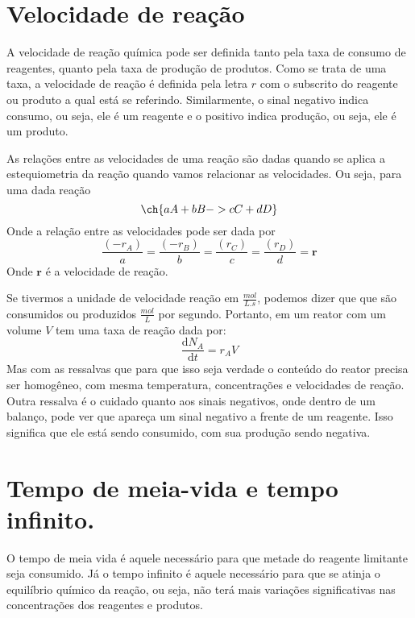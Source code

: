 \section{Velocidade de reação}
A velocidade de reação química pode ser definida tanto pela taxa de consumo de reagentes, quanto
pela taxa de produção de produtos. Como se trata de uma taxa, a velocidade de reação é definida pela
letra \(r\) com o subscrito do reagente ou produto a qual está se referindo. Similarmente, o sinal
negativo indica consumo, ou seja, ele é um reagente e o positivo indica produção, ou seja, ele é um
produto. \par 

As relações entre as velocidades de uma reação são dadas quando se aplica a estequiometria da reação
quando vamos relacionar as velocidades. Ou seja, para uma dada reação
\[
\ch{aA + bB -> cC + dD}
\]
Onde a relação entre as velocidades pode ser dada por
\begin{equation}
    \frac{\left( -r_{A} \right) }{a} = \frac{\left( -r_{B} \right) }{b} = \frac{\left( r_{C} \right) }{c} = \frac{\left( r_{D} \right) }{d} = \mathbf{r}
\end{equation}
Onde \(\mathbf{r}\) é a velocidade de reação. \par

Se tivermos a unidade de velocidade reação em \(\frac{mol}{L.s}\), podemos dizer que que são
consumidos ou produzidos \(\frac{mol}{L}\) por segundo. Portanto, em um reator com um volume \(V\)
tem uma taxa de reação dada por:
\begin{equation}\label{tax_reacao_reator}
    \frac{\mathrm{d}N_A}{\mathrm{d}t} = r_AV
\end{equation}
Mas com as ressalvas que para que isso seja verdade o conteúdo do reator precisa ser homogêneo, com
mesma temperatura, concentrações e velocidades de reação. Outra ressalva é o cuidado quanto aos
sinais negativos, onde dentro de um balanço, pode ver que apareça um sinal negativo a frente de um
reagente. Isso significa que ele está sendo consumido, com sua produção sendo negativa. \par
\section{Tempo de meia-vida e tempo infinito.}
O tempo de meia vida é aquele necessário para que metade do reagente limitante seja consumido. Já o
tempo infinito é aquele necessário para que se atinja o equilíbrio químico da reação, ou seja, não
terá mais variações significativas nas concentrações dos reagentes e produtos. \par
